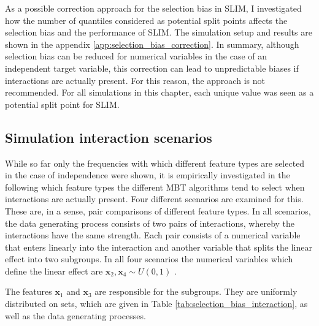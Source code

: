As a possible correction approach for the selection bias in SLIM, I investigated how the number of quantiles considered as potential split points affects the selection bias and the performance of SLIM. The simulation setup and results are shown in the appendix \ref{app:selection_bias_correction}. In summary, although selection bias can be reduced for numerical variables in the case of an independent target variable, this correction can lead to unpredictable biases if interactions are actually present. For this reason, the approach is not recommended. 
For all simulations in this chapter, each unique value was seen as a potential split point for SLIM.






\subsection{Simulation interaction scenarios} \label{selection_bias_interactions}
While so far only the frequencies with which different feature types are selected in the case of independence were shown, it is empirically investigated in the following which feature types the different MBT algorithms tend to select when interactions are actually present.
Four different scenarios are examined for this. These are, in a sense, pair comparisons of different feature types. In all scenarios, the data generating process consists of two pairs of interactions, whereby the interactions have the same strength. Each pair consists of a numerical variable that enters linearly into the interaction and another variable that splits the linear effect into two subgroups.
In all four scenarios the numerical variables which define the linear effect are 
 $\textbf{x}_{2}, \textbf{x}_{4} \sim U(0,1)$ .

The features $\textbf{x}_{1}$ and $\textbf{x}_{3}$ are responsible for the subgroups. They are uniformly distributed on sets, which are given in Table \ref{tab:selection_bias_interaction}, as well as the data generating processes.

